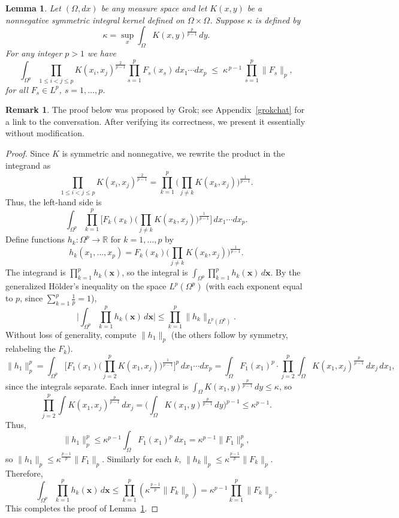 \documentclass[11pt]{article}
\newtheorem{lemma}[theorem]{Lemma}
\theoremstyle{definition}
\newtheorem{remark}[theorem]{Remark}
\newcommand{\1}{\mathbf{1}}
\begin{document}
\begin{lemma}\label{lem: dax1}
Let $(\Omega, dx)$ be any measure space and let $K(x,y)$ be a nonnegative
symmetric integral kernel defined on $\Omega\times\Omega$.
Suppose $\kappa$ is defined by
\[
\kappa = \sup_{x}\int_{\Omega} K(x,y)^{\frac{p}{p-1}}\,dy.
\]
For any integer $p>1$ we have
\[
\int_{\Omega^{p}}
\prod_{1\leq i< j\leq p}K(x_{i},x_{j})^{\frac{2}{p-1}}
\prod_{s=1}^{p} F_{s}(x_{s})\,dx_{1}\cdots dx_{p}
\;\le\;
\kappa^{\,p-1}\,
\prod_{s=1}^{p}\|F_{s}\|_{p},
\]
for all $F_{s} \in L^{p}$, $s=1, \ldots, p$.
\end{lemma}
\begin{remark}
The proof below was proposed by Grok; see Appendix~\ref{grokchat} for a link to the conversation. After verifying its correctness, we present it essentially without modification.
\end{remark}
\begin{proof}
Since $K$ is symmetric and nonnegative, we rewrite the product in the integrand as
$$\prod_{1 \leq i < j \leq p} K(x_i, x_j)^{\frac{2}{p-1}} = \prod_{k=1}^p \Big( \prod_{j \neq k} K(x_k, x_j) \Big)^{\frac{1}{p-1}}.$$
Thus, the left-hand side is
$$\int_{\Omega^p} \prod_{k=1}^p \Big[ F_k(x_k) \Big( \prod_{j \neq k} K(x_k, x_j) \Big)^{\frac{1}{p-1}} \Big] \, dx_1 \cdots dx_p.$$
Define functions $h_k: \Omega^p \to \mathbb{R}$ for $k=1, \dots, p$ by
$$
h_k(x_1, \dots, x_p) = F_k(x_k) \Big( \prod_{j \neq k} K(x_k, x_j) \Big)^{\frac{1}{p-1}}.
$$
The integrand is $\prod_{k=1}^p h_k(\mathbf{x})$, so the integral is $\int_{\Omega^p} \prod_{k=1}^p h_k(\mathbf{x}) \, d\mathbf{x}$.
By the generalized Hölder's inequality on the space $L^p(\Omega^p)$ (with each exponent equal to $p$, since $\sum_{k=1}^p \frac{1}{p} = 1$),
$$
\Big| \int_{\Omega^p} \prod_{k=1}^p h_k(\mathbf{x}) \, d\mathbf{x} \Big| \leq \prod_{k=1}^p \| h_k \|_{L^p(\Omega^p)}.
$$
Without loss of generality, compute $\| h_1 \|_p$ (the others follow by symmetry, relabeling the $F_k$).
$$
\| h_1 \|_p^p = \int_{\Omega^p} \Big[ F_1(x_1) \Big( \prod_{j=2}^p K(x_1, x_j) \Big)^{\frac{1}{p-1}} \Big]^p \, dx_1 \cdots dx_p
= \int_{\Omega} F_1(x_1)^p \cdot \prod_{j=2}^p \int_{\Omega} K(x_1, x_j)^{\frac{p}{p-1}} \, dx_j\, dx_1,
$$
since the integrals separate. Each inner integral is $\int_\Omega K(x_1, y)^{\frac{p}{p-1}} \, dy \leq \kappa$, so
$$
\prod_{j=2}^p \int K(x_1, x_j)^{\frac{p}{p-1}} \, dx_j = \Big( \int_\Omega K(x_1, y)^{\frac{p}{p-1}} \, dy \Big)^{p-1} \leq \kappa^{p-1}.
$$
Thus,
$$\| h_1 \|_p^p \leq \kappa^{p-1} \int_\Omega F_1(x_1)^p \, dx_1 = \kappa^{p-1} \| F_1 \|_p^p,$$
so $\| h_1 \|_p \leq \kappa^{\frac{p-1}{p}} \| F_1 \|_p$.
Similarly for each $k$, $\| h_k \|_p \leq \kappa^{\frac{p-1}{p}} \| F_k \|_p$.
Therefore,
$$\int_{\Omega^p} \prod_{k=1}^p h_k(\mathbf{x}) \, d\mathbf{x} \leq \prod_{k=1}^p \left( \kappa^{\frac{p-1}{p}} \| F_k \|_p \right) = \kappa^{p-1} \prod_{k=1}^p \| F_k \|_p.$$
This completes the proof of Lemma~\ref{lem: dax1}.
\end{proof}
\end{document}
